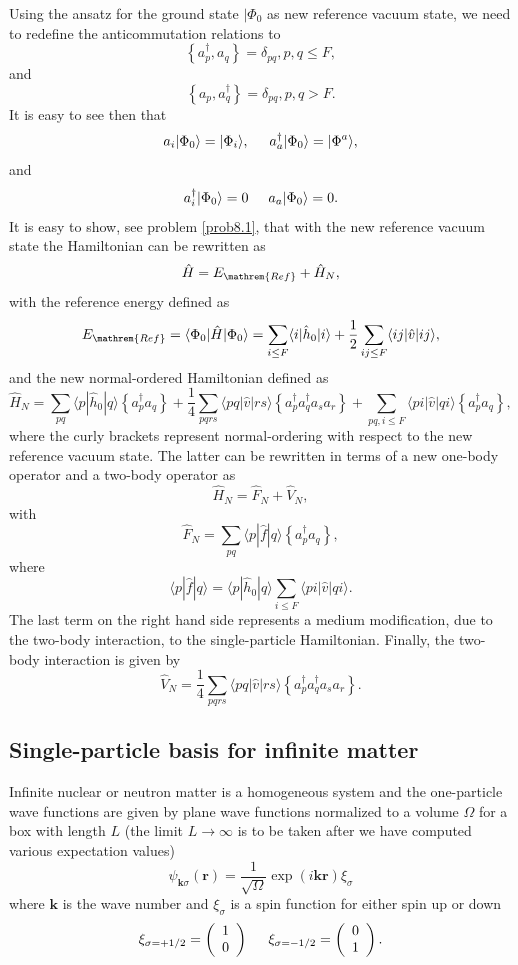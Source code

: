 Using the ansatz for the ground state $\vert \Phi_0$ as new reference vacuum state, we need to redefine the anticommutation relations to
\[
\left\{a_p^\dagger, a_q \right\}= \delta_{pq}, p, q \leq F, 
\]
and
\[
\left\{a_p, a_q^\dagger \right\} = \delta_{pq}, p, q > F.
\]
It is easy to see then that         
\[
        a_i|\Phi_0\rangle = |\Phi_i\rangle, \hspace{0.5cm} a_a^\dagger|\Phi_0\rangle = |\Phi^a\rangle,
\]
and         
\[
a_i^\dagger|\Phi_0\rangle = 0 \hspace{0.5cm}  a_a|\Phi_0\rangle = 0.
\]
It is easy to show, see problem \ref{prob8.1}, that with the new reference vacuum state the Hamiltonian can be rewritten as 
\[
\hat{H}=E_{\mathrem{Ref}}+\hat{H}_N,
\]
with the reference energy defined as 
\[
E_{\mathrem{Ref}}=\langle \Phi_0 \vert \hat{H} \vert \Phi_0\rangle = \sum_{i\le F} \langle i|\hat{h}_0|i\rangle + \frac{1}{2} \sum_{ij\le F}\langle ij|\hat{v}|ij\rangle,
\]
and the new normal-ordered Hamiltonian defined as 
\[
\hat{H}_N = \sum_{pq} \langle p|\hat{h}_0|q\rangle \left\{a^\dagger_p a_q\right\}+\frac{1}{4} \sum_{pqrs} \langle pq|\hat{v}|rs\rangle \left\{a^\dagger_p a^\dagger_q a_s  a_r\right\}+\sum_{pq,i\le F} \langle pi|\hat{v}|qi\rangle \left\{a^\dagger_p a_q\right\},  
\]
where the curly brackets represent normal-ordering with respect to the new reference vacuum state. 
The latter can be rewritten in terms of a new one-body operator and a two-body operator as
\[
\hat{H}_N=\hat{F}_N+\hat{V}_N,
\]
with
\[
\hat{F}_N=\sum_{pq} \langle p|\hat{f}|q\rangle \left\{a^\dagger_p a_q\right\},
\]
where
\[
\langle p|\hat{f}|q\rangle= \langle p|\hat{h}_0|q\rangle \sum_{i\le F} \langle pi|\hat{v}|qi\rangle.  
\]
The last term on the right hand side  represents a medium modification, due to the two-body interaction, to the single-particle Hamiltonian.
Finally, the two-body interaction is given by
\[	     
\hat{V}_N = \frac{1}{4} \sum_{pqrs} \langle pq|\hat{v}|rs\rangle \left\{a^\dagger_p a^\dagger_q a_s  a_r\right\}.
\]


\subsection{Single-particle basis for infinite matter}

Infinite nuclear or neutron matter is a homogeneous system and the
one-particle wave functions are given by plane wave functions
normalized to a volume $\Omega$ for a box with length $L$ (the limit
$L\rightarrow \infty$ is to be taken after we have computed various
expectation values)
\[
\psi_{\mathbf{k}\sigma}(\mathbf{r})= \frac{1}{\sqrt{\Omega}}\exp{(i\mathbf{kr})}\xi_{\sigma}
\]
where $\mathbf{k}$ is the wave number and  $\xi_{\sigma}$ is a spin function for either spin up or down
\[ 
\xi_{\sigma=+1/2}=\left(\begin{array}{c} 1 \\ 0 \end{array}\right) \hspace{0.5cm}
\xi_{\sigma=-1/2}=\left(\begin{array}{c} 0 \\ 1 \end{array}\right).
\]

